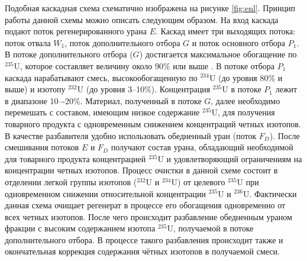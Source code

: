 Подобная каскадная схема схематично изображена на рисунке \ref{fig:enl}. Принцип работы данной схемы можно описать следующим образом. На вход каскада подают поток регенерированного урана $E$. Каскад имеет три выходящих потока: поток отвала $W_1$, поток дополнительного отбора $G$ и поток основного отбора $P_1$. В потоке дополнительного отбора ($G$) достигается максимальное обогащение по $^{235}$U, которое составляет величину около 90\% или выше \cite{palkinRestorationIsotopicComposition2020}. В потоке отбора $P_1$ каскада нарабатывают смесь, высокообогащенную по $^{234}$U (до уровня 80\% и выше) и изотопу $^{232}$U (до уровня 3--10\%). Концентрация $^{235}$U в потоке $P_1$ лежит в диапазоне 10–-20\%. Материал, полученный в потоке $G$, далее необходимо перемешать с составом, имеющим низкое содержание $^{235}$U, для получения товарного продукта с одновременным снижением концентраций четных изотопов. В качестве разбавителя удобно использовать обедненный уран (поток $F_D$). После смешивания потоков $E$ и $F_D$ получают состав урана, обладающий необходимой для товарного продукта концентрацией $^{235}$U и удовлетворяющий ограничениям на концентрации четных изотопов.
Процесс очистки в данной схеме состоит в отделении легкой группы изотопов ($^{232}$U и $^{234}$U) от целевого $^{235}$U при одновременном снижении относительной концентрации $^{235}$U и $^{236}$U. Фактически данная схема очищает регенерат в процессе его обогащения одновременно от всех четных изотопов. После чего происходит разбавление обедненным ураном фракции с высоким содержанием изотопа $^{235}$U, получаемой в потоке дополнительного отбора. В процессе такого разбавления происходит также и окончательная коррекция содержания чётных изотопов в получаемой смеси.

